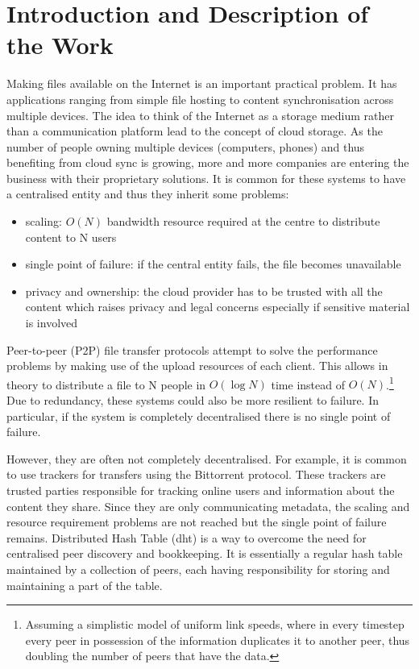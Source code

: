 \documentclass[12pt]{article}
\begin{document}
\tableofcontents
\clearpage

\section{Introduction and Description of the Work}

Making files available on the Internet is an important practical problem. It has applications ranging from simple file hosting to content synchronisation across multiple devices. The idea to think of the Internet as a storage medium rather than a communication platform lead to the concept of cloud storage. As the number of people owning multiple devices (computers, phones) and thus benefiting from cloud sync is growing, more and more companies are entering the business with their proprietary solutions. It is common for these systems to have a centralised entity and thus they inherit some problems:

\begin{itemize}
\item{scaling: $O(N)$ bandwidth resource required at the centre to distribute content to N users}
\item{single point of failure: if the central entity fails, the file becomes unavailable}
\item{privacy and ownership: the cloud provider has to be trusted with all the content which raises privacy and legal concerns especially if sensitive material is involved}
\end{itemize}

Peer-to-peer (P2P) file transfer protocols attempt to solve the performance problems by making use of the upload resources of each client. This allows in theory to distribute a file to N people in $O(\log N)$ time instead of $O(N)$.\footnote{Assuming a simplistic model of uniform link speeds, where in every timestep every peer in possession of the information duplicates it to another peer, thus doubling the number of peers that have the data.} Due to redundancy, these systems could also be more resilient to failure. In particular, if the system is completely decentralised there is no single point of failure.

However, they are often not completely decentralised. For example, it is common to use trackers for transfers using the Bittorrent protocol. These trackers are trusted parties responsible for tracking online users and information about the content they share. Since they are only communicating metadata, the scaling and resource requirement problems are not reached but the single point of failure remains. Distributed Hash Table (\gls{dht}) is a way to overcome the need for centralised peer discovery and bookkeeping. It is essentially a regular hash table maintained by a collection of peers, each having responsibility for storing and maintaining a part of the table.
\end{document}
